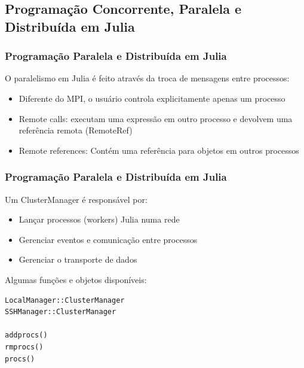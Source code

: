 \documentclass[10pt, compress]{beamer}
\begin{document}
\subsection{Programação Concorrente, Paralela e Distribuída em Julia}

\begin{frame}[fragile]
    \frametitle{Programação Paralela e Distribuída em Julia}
    O paralelismo em Julia é feito através da troca de mensagens 
    entre processos:
    \begin{itemize}
        \item Diferente do MPI, o usuário controla 
            explicitamente \alert{apenas um processo}
        \item \alert{Remote calls}: executam uma \alert{expressão} em 
            outro processo e devolvem uma referência remota (\alert{RemoteRef})
        \item \alert{Remote references}: Contém uma referência para objetos 
            em \alert{outros processos}
    \end{itemize}
    \let\thefootnote\relax{}
    \let\thefootnote\relax{}
\end{frame}

\begin{frame}[fragile]
    \frametitle{Programação Paralela e Distribuída em Julia}
    Um \alert{ClusterManager} é responsável por:
    \begin{itemize}
        \item Lançar processos (\alert{workers}) Julia numa rede 
        \item Gerenciar \alert{eventos} e \alert{comunicação}
            entre processos
        \item Gerenciar o \alert{transporte} de dados 
    \end{itemize}
    Algumas funções e objetos disponíveis:
    \begin{lstlisting}
LocalManager::ClusterManager
SSHManager::ClusterManager

addprocs()
rmprocs()
procs()
    \end{lstlisting}
    \let\thefootnote\relax{}
    \let\thefootnote\relax{}
\end{frame}
\end{document}
